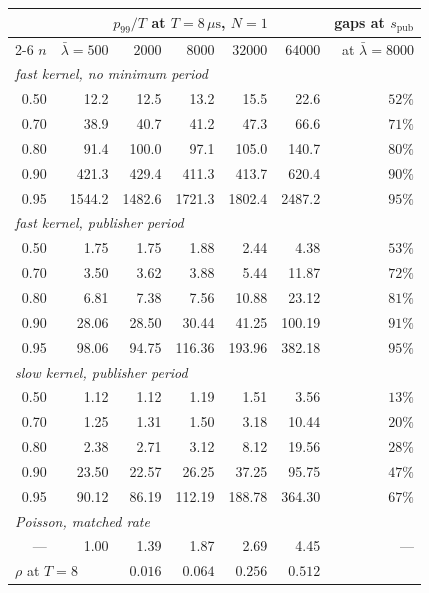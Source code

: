 \documentclass[11pt]{article}
\newcommand{\spub}{s_{\mathrm{pub}}}
\begin{document}
\begin{table}[H]
\centering
\small
\begin{tabular}{@{}r rrrrr r@{}}
\toprule
 & \multicolumn{5}{c}{$p_{99}/T$ at $T = 8\,\mu\mathrm{s}$, $N = 1$} & gaps at $\spub$ \\
\cmidrule(lr){2-6}
$n$ & $\bar\lambda{=}500$ & $2000$ & $8000$ & $32000$ & $64000$ & at $\bar\lambda{=}8000$ \\
\midrule
\multicolumn{7}{l}{\emph{fast kernel, no minimum period}} \\
0.50 &   12.2 &   12.5 &   13.2 &   15.5 &   22.6 & $52\%$ \\
0.70 &   38.9 &   40.7 &   41.2 &   47.3 &   66.6 & $71\%$ \\
0.80 &   91.4 &  100.0 &   97.1 &  105.0 &  140.7 & $80\%$ \\
0.90 &  421.3 &  429.4 &  411.3 &  413.7 &  620.4 & $90\%$ \\
0.95 & 1544.2 & 1482.6 & 1721.3 & 1802.4 & 2487.2 & $95\%$ \\
\midrule
\multicolumn{7}{l}{\emph{fast kernel, publisher period}} \\
0.50 &   1.75 &   1.75 &   1.88 &   2.44 &   4.38 & $53\%$ \\
0.70 &   3.50 &   3.62 &   3.88 &   5.44 &  11.87 & $72\%$ \\
0.80 &   6.81 &   7.38 &   7.56 &  10.88 &  23.12 & $81\%$ \\
0.90 &  28.06 &  28.50 &  30.44 &  41.25 & 100.19 & $91\%$ \\
0.95 &  98.06 &  94.75 & 116.36 & 193.96 & 382.18 & $95\%$ \\
\midrule
\multicolumn{7}{l}{\emph{slow kernel, publisher period}} \\
0.50 &   1.12 &   1.12 &   1.19 &   1.51 &   3.56 & $13\%$ \\
0.70 &   1.25 &   1.31 &   1.50 &   3.18 &  10.44 & $20\%$ \\
0.80 &   2.38 &   2.71 &   3.12 &   8.12 &  19.56 & $28\%$ \\
0.90 &  23.50 &  22.57 &  26.25 &  37.25 &  95.75 & $47\%$ \\
0.95 &  90.12 &  86.19 & 112.19 & 188.78 & 364.30 & $67\%$ \\
\midrule
\multicolumn{7}{l}{\emph{Poisson, matched rate}} \\
---  &   1.00 &   1.39 &   1.87 &   2.69 &   4.45 & --- \\
\midrule
\multicolumn{2}{l}{$\rho$ at $T = 8$} & $0.016$ & $0.064$ & $0.256$ & $0.512$ & \\

\end{tabular}
\end{table}
\end{document}
